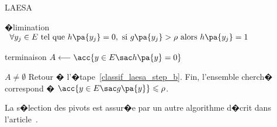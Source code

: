 \begin{xalgorithm}{LAESA}
            
            \begin{xalgostep}{�limination}
                $\begin{array}{rl}
                \forall y_j \in E \text{ tel que } h\pa{y_j} = 0, \text{ si } g\pa{y_j} > \rho \text{ alors }
                h\pa{y_j} = 1
                \end{array}$
            \end{xalgostep}
            
            \begin{xalgostep}{terminaison}
                $A \longleftarrow \acc{ y \in E \sac h\pa{y} = 0 }$ \\
                \begin{xif}{$A \neq \emptyset$}
                Retour � l'�tape~\ref{classif_laesa_step_b}.
                \xelse
                Fin, l'ensemble cherch� correspond � $\acc{y \in E \sac g\pa{y}} \leqslant \rho$.
                \end{xif}
            \end{xalgostep}
            
            \end{xalgorithm}




La s�lection des pivots est assur�e par un autre algorithme d�crit dans l'article~.


